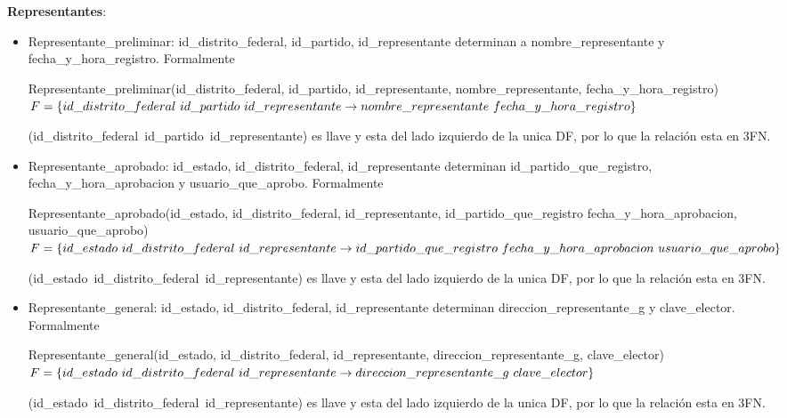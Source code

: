 \documentclass[a4paper,twoside,11pt]{article}
\begin{document}
\textbf{Representantes}:
\begin{itemize}
  \item Representante\_preliminar: id\_distrito\_federal, id\_partido, id\_representante determinan
        a nombre\_representante y fecha\_y\_hora\_registro. Formalmente

        Representante\_preliminar(id\_distrito\_federal, id\_partido, id\_representante,
        nombre\_representante, fecha\_y\_hora\_registro)\\
        $F=\{id\_distrito\_federal~id\_partido~id\_representante\rightarrow\\
        nombre\_representante~fecha\_y\_hora\_registro\}$

        (id\_distrito\_federal~id\_partido~id\_representante) es llave y esta del lado izquierdo de la unica DF,
        por lo que la relación esta en 3FN.

  \item Representante\_aprobado: id\_estado, id\_distrito\_federal, id\_representante determinan
        id\_partido\_que\_registro, fecha\_y\_hora\_aprobacion y usuario\_que\_aprobo. Formalmente

        Representante\_aprobado(id\_estado, id\_distrito\_federal, id\_representante, id\_partido\_que\_registro
        fecha\_y\_hora\_aprobacion, usuario\_que\_aprobo)\\
        $F=\{id\_estado~id\_distrito\_federal~id\_representante\rightarrow\\
        id\_partido\_que\_registro~fecha\_y\_hora\_aprobacion~usuario\_que\_aprobo\}$

        (id\_estado~id\_distrito\_federal~id\_representante) es llave y esta del lado izquierdo de la unica DF,
        por lo que la relación esta en 3FN.

  \item Representante\_general: id\_estado, id\_distrito\_federal, id\_representante determinan
        direccion\_representante\_g y clave\_elector. Formalmente

        Representante\_general(id\_estado, id\_distrito\_federal, id\_representante,
        direccion\_representante\_g, clave\_elector)\\
        $F=\{id\_estado~id\_distrito\_federal~id\_representante\rightarrow\\
        direccion\_representante\_g~clave\_elector\}$

        (id\_estado~id\_distrito\_federal~id\_representante) es llave y esta del lado izquierdo de la unica DF,
        por lo que la relación esta en 3FN.


\end{itemize}
\end{document}
